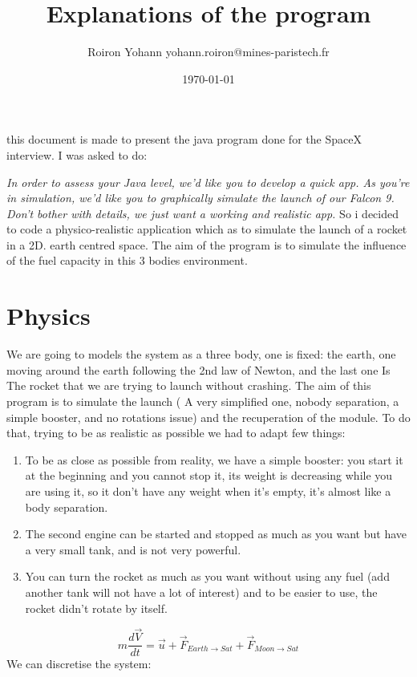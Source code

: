 \documentclass{scrartcl}
\begin{document}
\title{Explanations of the program}
\date{\today{}}

\author{Roiron Yohann yohann.roiron@mines-paristech.fr}

\maketitle


this document is made to present the java program done for the SpaceX interview.
I was asked to do:

\emph{ In order to assess your Java level, we’d like you to develop a quick app. As you’re in simulation, we’d like you to graphically simulate the launch of our Falcon 9. Don’t bother with details, we just want a working and realistic app.}
So i decided to code a physico-realistic application which as to simulate the launch of a rocket in a 2D. earth centred space. The aim of the program is to simulate the influence of the fuel capacity in this 3 bodies environment.

\section{Physics}
We are going to models the system as a three body, one is fixed: the earth, one moving around the earth following the 2nd law of Newton, and the last one Is The rocket that we are trying to launch without crashing. The aim of this program is to simulate the launch ( A very simplified one, nobody separation, a simple booster, and no rotations issue) and the recuperation of the module. To do that, trying to be as realistic as possible we had to adapt few things:
\begin{enumerate}
\item To be as close as possible from reality, we have a simple booster: you start it at the beginning and you cannot stop it, its weight is decreasing while you are using it, so it don't have any weight when it's empty, it's almost like a body separation.
\item The second engine can be started and stopped as much as you want but have a very small tank, and is not very powerful.
\item You can turn the rocket as much as you want without using any fuel (add another tank will not have a lot of interest) and to be easier to use, the rocket didn't rotate by itself.
\end{enumerate}

$$m\frac{d\vec V}{dt}=\vec u+ \vec F_{Earth \rightarrow Sat} + \vec F _{Moon \rightarrow Sat}$$
We can discretise the system:
\end{document}
